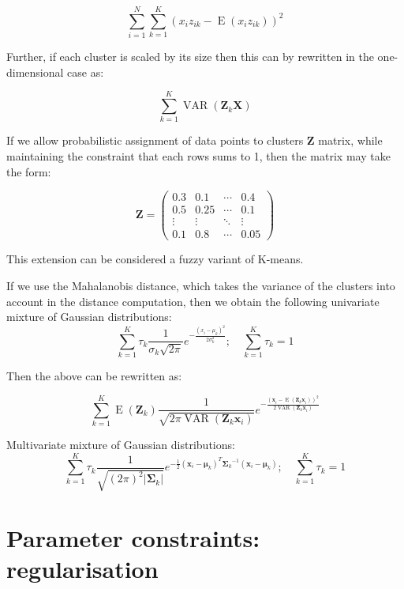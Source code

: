 \[
  \sum_{i=1}^N \sum_{k=1}^{K} ( x_i z_{ik} - \operatorname{E}(x_i z_{ik}) )^2 
\]

Further, if each cluster is scaled by its size then this can by rewritten in the one-dimensional case as:


\[
  \sum_{k=1}^{K} \operatorname{VAR}(\mathbf Z_k \mathbf X)
\]


If we allow probabilistic assignment of data points to clusters $\mathbf Z$ matrix, while maintaining the constraint that each rows sums to 1,
then the matrix may take the form:


\[
\mathbf Z =
 \begin{pmatrix}
  0.3 & 0.1 & \cdots & 0.4 \\
  0.5 & 0.25 & \cdots & 0.1 \\
  \vdots  & \vdots  & \ddots & \vdots  \\
  0.1 & 0.8 & \cdots & 0.05
 \end{pmatrix}
\]

This extension can be considered a fuzzy variant of K-means.

If we use the Mahalanobis distance, which 
takes the variance of the clusters into account in the distance computation,
then we obtain the following univariate mixture of Gaussian distributions:
\[
\sum_{k=1}^K\tau_k \frac{1}{\sigma_k\sqrt{2\pi}} e^{ -\frac{(x_i-\mu_k)^2}{2\sigma_k^2} }; \quad \sum_{k=1}^K\tau_k = 1
\]



Then the above can be rewritten as:


\[
  \sum_{k=1}^K \operatorname{E}(\mathbf Z_k) \frac{1}{\sqrt{2\pi \operatorname{VAR} (\mathbf Z_k \mathbf x_i)} } e^{ -\frac{(\mathbf x_i- \operatorname{E}(\mathbf Z_k \mathbf x_i))^2}{2\operatorname{VAR}(\mathbf Z_k \mathbf x_i)} }
\]



Multivariate mixture of Gaussian distributions:
\[
\sum_{k=1}^K\tau_k \frac{1}{\sqrt{(2\pi)^2|\boldsymbol\Sigma_k|}}
e^{-\frac{1}{2}({\mathbf x_i}-{\boldsymbol\mu_k})^T{\boldsymbol\Sigma_k}^{-1}({\mathbf x_i}-{\boldsymbol\mu_k})
}; \quad \sum_{k=1}^K\tau_k = 1
\]


\section{Parameter constraints: regularisation} 

